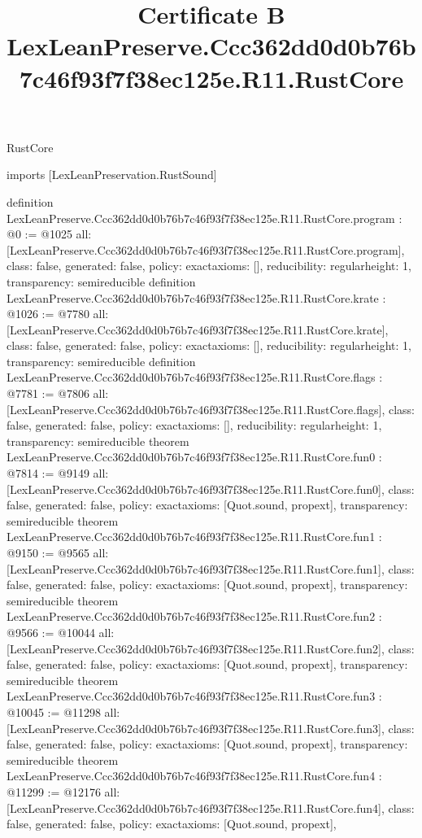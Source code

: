 \begin{lexlean}{RustCore}
\title{Certificate B LexLeanPreserve.Ccc362dd0d0b76b7c46f93f7f38ec125e.R11.RustCore}
\begin{coremodule}
imports [LexLeanPreservation.RustSound]

definition LexLeanPreserve.Ccc362dd0d0b76b7c46f93f7f38ec125e.R11.RustCore.program : @0 := @1025 {
  all: [LexLeanPreserve.Ccc362dd0d0b76b7c46f93f7f38ec125e.R11.RustCore.program],
  class: false,
  generated: false,
  policy: exact{axioms: []},
  reducibility: regular{height: 1},
  transparency: semireducible
}
definition LexLeanPreserve.Ccc362dd0d0b76b7c46f93f7f38ec125e.R11.RustCore.krate : @1026 := @7780 {
  all: [LexLeanPreserve.Ccc362dd0d0b76b7c46f93f7f38ec125e.R11.RustCore.krate],
  class: false,
  generated: false,
  policy: exact{axioms: []},
  reducibility: regular{height: 1},
  transparency: semireducible
}
definition LexLeanPreserve.Ccc362dd0d0b76b7c46f93f7f38ec125e.R11.RustCore.flags : @7781 := @7806 {
  all: [LexLeanPreserve.Ccc362dd0d0b76b7c46f93f7f38ec125e.R11.RustCore.flags],
  class: false,
  generated: false,
  policy: exact{axioms: []},
  reducibility: regular{height: 1},
  transparency: semireducible
}
theorem LexLeanPreserve.Ccc362dd0d0b76b7c46f93f7f38ec125e.R11.RustCore.fun0 : @7814 := @9149 {
  all: [LexLeanPreserve.Ccc362dd0d0b76b7c46f93f7f38ec125e.R11.RustCore.fun0],
  class: false,
  generated: false,
  policy: exact{axioms: [Quot.sound, propext]},
  transparency: semireducible
}
theorem LexLeanPreserve.Ccc362dd0d0b76b7c46f93f7f38ec125e.R11.RustCore.fun1 : @9150 := @9565 {
  all: [LexLeanPreserve.Ccc362dd0d0b76b7c46f93f7f38ec125e.R11.RustCore.fun1],
  class: false,
  generated: false,
  policy: exact{axioms: [Quot.sound, propext]},
  transparency: semireducible
}
theorem LexLeanPreserve.Ccc362dd0d0b76b7c46f93f7f38ec125e.R11.RustCore.fun2 : @9566 := @10044 {
  all: [LexLeanPreserve.Ccc362dd0d0b76b7c46f93f7f38ec125e.R11.RustCore.fun2],
  class: false,
  generated: false,
  policy: exact{axioms: [Quot.sound, propext]},
  transparency: semireducible
}
theorem LexLeanPreserve.Ccc362dd0d0b76b7c46f93f7f38ec125e.R11.RustCore.fun3 : @10045 := @11298 {
  all: [LexLeanPreserve.Ccc362dd0d0b76b7c46f93f7f38ec125e.R11.RustCore.fun3],
  class: false,
  generated: false,
  policy: exact{axioms: [Quot.sound, propext]},
  transparency: semireducible
}
theorem LexLeanPreserve.Ccc362dd0d0b76b7c46f93f7f38ec125e.R11.RustCore.fun4 : @11299 := @12176 {
  all: [LexLeanPreserve.Ccc362dd0d0b76b7c46f93f7f38ec125e.R11.RustCore.fun4],
  class: false,
  generated: false,
  policy: exact{axioms: [Quot.sound, propext]},
}
\end{coremodule}
\end{lexlean}
